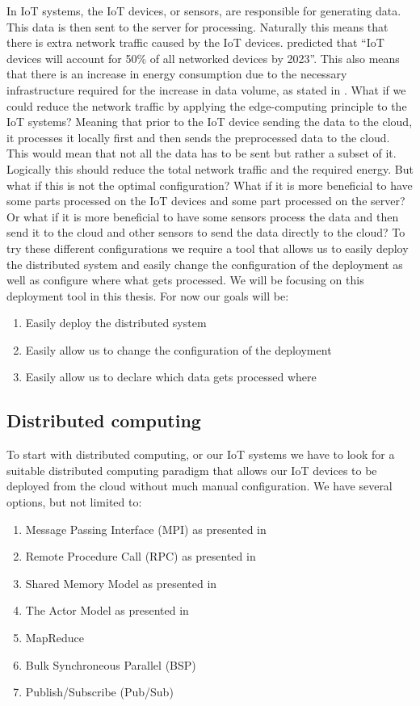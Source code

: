 \documentclass[a4paper]{article}
\begin{document}
In IoT systems, the IoT devices, or sensors, are responsible for generating data. This data is then sent to the server for processing. Naturally this means that there is extra network traffic caused by the IoT devices. \cite{differentnetworkneedsiot} predicted that \enquote{IoT devices will account for 50\% of all networked devices by 2023}. This also means that there is an increase in energy consumption due to the necessary infrastructure required for the increase in data volume, as stated in \cite{datavolumeeffects}. What if we could reduce the network traffic by applying the edge-computing principle to the IoT systems? Meaning that prior to the IoT device sending the data to the cloud, it processes it locally first and then sends the preprocessed data to the cloud. This would mean that not all the data has to be sent but rather a subset of it. Logically this should reduce the total network traffic and the required energy. But what if this is not the optimal configuration? What if it is more beneficial to have some parts processed on the IoT devices and some part processed on the server? Or what if it is more beneficial to have some sensors process the data and then send it to the cloud and other sensors to send the data directly to the cloud? To try these different configurations we require a tool that allows us to easily deploy the distributed system and easily change the configuration of the deployment as well as configure where what gets processed. We will be focusing on this deployment tool in this thesis. For now our goals will be:
\begin{enumerate}
    \item Easily deploy the distributed system
    \item Easily allow us to change the configuration of the deployment
    \item Easily allow us to declare which data gets processed where
\end{enumerate}
\subsection{Distributed computing}
To start with distributed computing, or our IoT systems we have to look for a suitable distributed computing paradigm that allows our IoT devices to be deployed from the cloud without much manual configuration. We have several options, but not limited to:
\begin{enumerate}
    \item Message Passing Interface (MPI) as presented in \cite{MPI}
    \item Remote Procedure Call (RPC) as presented in \cite{RPC}
    \item Shared Memory Model as presented in \cite{SMM}
    \item The Actor Model as presented in \cite{ActorModel}
    \item MapReduce
    \item Bulk Synchroneous Parallel (BSP)
    \item Publish/Subscribe (Pub/Sub)
\end{enumerate}
\end{document}

